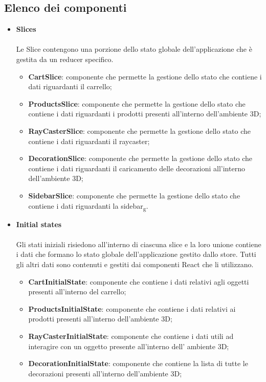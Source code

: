 \subsection{Elenco dei componenti}
\begin{itemize}
	\item \textbf{\large Slices}
	\\\\
	Le Slice contengono una porzione dello stato globale dell'applicazione che è gestita da un reducer specifico.
		\begin{itemize}
			\item \textbf{CartSlice}: componente che permette la gestione dello stato che contiene i dati riguardanti il carrello;
			\item \textbf{ProductsSlice}: componente che permette la gestione dello stato che contiene i dati riguardanti i prodotti 
			presenti all'interno dell'ambiente 3D;
			\item \textbf{RayCasterSlice}: componente che permette la gestione dello stato che contiene i dati riguardanti il
			raycaster;
			\item \textbf{DecorationSlice}: componente che permette la gestione dello stato che contiene i dati riguardanti
			il caricamento delle decorazioni all'interno dell'ambiente 3D;
			\item \textbf{SidebarSlice}: componente che permette la gestione dello stato che contiene i dati riguardanti
			la sidebar\textsubscript{g}.
		\end{itemize}
	\item \textbf{\large Initial states}
	\\\\
	Gli stati iniziali risiedono all'interno di ciascuna slice e la loro unione contiene i dati che formano lo stato globale dell'applicazione gestito dallo store.
	Tutti gli altri dati sono contenuti e gestiti dai componenti React che li utilizzano.
		\begin{itemize}
			\item \textbf{CartInitialState}: componente che contiene i dati relativi agli oggetti presenti all'interno del carrello;
			\item \textbf{ProductsInitialState}: componente che contiene i dati relativi ai prodotti presenti all'interno dell'ambiente 3D;
			\item \textbf{RayCasterInitialState}: componente che contiene i dati utili ad interagire con un oggetto presente all'interno dell'
			ambiente 3D;
			\item \textbf{DecorationInitialState}: componente che contiene la lista di tutte le decorazioni presenti all'interno dell'ambiente 3D;

\end{itemize}
\end{itemize}
